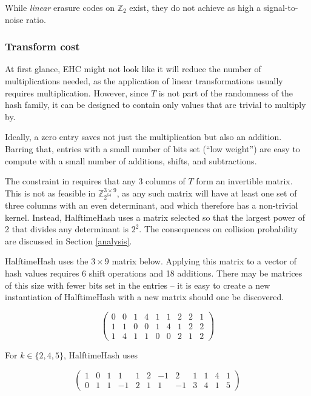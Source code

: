 \documentclass[sigconf, nonacm]{acmart}
\newcommand{\ints}{\mathbb{Z}}
\begin{document}
While {\em linear} erasure codes on $\ints_2$ exist, they do not achieve as high a signal-to-noise ratio. \cite{codetables.de}

\subsubsection{Transform cost}

At first glance, EHC might not look like it will reduce the number of multiplications needed, as the application of linear transformations usually requires multiplication.
However, since $T$ is not part of the randomness of the hash family, it can be designed to contain only values that are trivial to multiply by.

Ideally, a zero entry saves not just the multiplication but also an addition.
Barring that, entries with a small number of bits set (``low weight'') are easy to compute with a small number of additions, shifts, and subtractions.

The constraint in \cite{ehc-nandi} requires that any 3 columns of $T$ form an invertible matrix.
This is not as feasible in $\ints_{2^{64}}^{3 \times 9}$, as any such matrix will have at least one set of three columns with an even determinant, and which therefore has a non-trivial kernel.
Instead, HalftimeHash uses a matrix selected so that the largest power of 2 that divides any determinant is $2^2$.
The consequences on collision probability are discussed in Section \ref{analysis}.

HalftimeHash uses the $3 \times 9$ matrix below.
Applying this matrix to a vector of hash values requires 6 shift operations and 18 additions.
There may be matrices of this size with fewer bits set in the entries -- it is easy to create a new instantiation of HalftimeHash with a new matrix should one be discovered.

\begin{displaymath}
  \left(
\begin{array}{rrrrrrrrr}
  0 & 0 & 1 & 4 & 1 & 1 & 2 & 2 & 1\\
  1 & 1 & 0 & 0 & 1 & 4 & 1 & 2 & 2\\
  1 & 4 & 1 & 1 & 0 & 0 & 2 & 1 & 2
\end{array}
\right)
\end{displaymath}

For $k \in \{2, 4, 5\}$, HalftimeHash uses

\[
\left(
\begin{array}{rrrrrrrrrrrr}
  1 & 0 & 1 & 1 & 1 & 2 & -1 & 2 & 1 & 1 & 4 & 1\\
  0 & 1 & 1 & -1 & 2 & 1 & 1 & -1 & 3 & 4 & 1 & 5
\end{array}
\right)
\]
\end{document}
